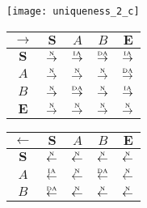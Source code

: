 \begin{figure}[htbp]
  \begin{subfigure}{1\textwidth}
    \vspace{1em}
    \centering
    \begin{minipage}[b]{1\textwidth}
      \centering
      \texttt{[image: uniqueness\_2\_c]}
    \end{minipage}
    \begin{minipage}[b]{0.3\textwidth}
      \vspace{1em}
      \centering
      \begin{tabular}{|c|c|c|c|c|} \hline
        $\rightarrow$ & $\bm{S}$ & $A$ & $B$ & $\bm{E}$\\ \hline
        $\bm{S}$ & $\overset{\text{\tiny{N}}}{\rightarrow}$ & $\overset{\text{\tiny{IA}}}{\rightarrow}$ & $\overset{\text{\tiny{DA}}}{\rightarrow}$ & $\overset{\text{\tiny{IA}}}{\rightarrow}$\\ \hline
        $A$ & $\overset{\text{\tiny{N}}}{\rightarrow}$ & $\overset{\text{\tiny{N}}}{\rightarrow}$ & $\overset{\text{\tiny{N}}}{\rightarrow}$ & $\overset{\text{\tiny{DA}}}{\rightarrow}$\\ \hline
        $B$ & $\overset{\text{\tiny{N}}}{\rightarrow}$ & $\overset{\text{\tiny{DA}}}{\rightarrow}$ & $\overset{\text{\tiny{N}}}{\rightarrow}$ & $\overset{\text{\tiny{IA}}}{\rightarrow}$\\ \hline
        $\bm{E}$ & $\overset{\text{\tiny{N}}}{\rightarrow}$ & $\overset{\text{\tiny{N}}}{\rightarrow}$ & $\overset{\text{\tiny{N}}}{\rightarrow}$ & $\overset{\text{\tiny{N}}}{\rightarrow}$\\ \hline
      \end{tabular}
    \end{minipage}
    \begin{minipage}[b]{0.3\textwidth}
      \vspace{1em}
      \centering
      \begin{tabular}{|c|c|c|c|c|} \hline
        $\leftarrow$ & $\bm{S}$ & $A$ & $B$ & $\bm{E}$\\ \hline
        $\bm{S}$ & $\overset{\text{\tiny{N}}}{\leftarrow}$ & $\overset{\text{\tiny{N}}}{\leftarrow}$ & $\overset{\text{\tiny{N}}}{\leftarrow}$ & $\overset{\text{\tiny{N}}}{\leftarrow}$\\ \hline
        $A$ & $\overset{\text{\tiny{IA}}}{\leftarrow}$ & $\overset{\text{\tiny{N}}}{\leftarrow}$ & $\overset{\text{\tiny{DA}}}{\leftarrow}$ & $\overset{\text{\tiny{N}}}{\leftarrow}$\\ \hline
        $B$ & $\overset{\text{\tiny{DA}}}{\leftarrow}$ & $\overset{\text{\tiny{N}}}{\leftarrow}$ & $\overset{\text{\tiny{N}}}{\leftarrow}$ & $\overset{\text{\tiny{N}}}{\leftarrow}$\\ \hline

\end{tabular}
\end{minipage}
\end{subfigure}
\end{figure}
